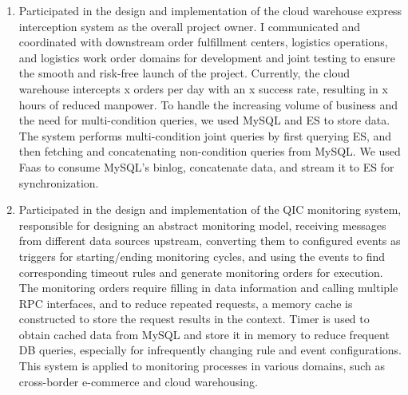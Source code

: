 \documentclass{resume}
\newcommand{\en}[1]{#1}
\newcommand{\zh}[1]{}
\begin{document}
\begin{itemize}
\begin{enumerate}
                      \zh{独自负责了「公有云测试流程」的开发，完善了ksboot新项目从零到一的搭建，包括不限于符合现代软件工程的设计规范、统一异常处理及RESTful风格返回。
                           此外，确保了新系统与nacos/星环的兼容性；并顺利实现了与旧云集平台的流程调用集成；定时任务切换为公司的任务调度平台；
                           权限采用前后端结合来控制，提高了系统安全性，并完善了测试流程对账相关的功能，基于用户反馈，我持续修复缺陷并升级系统功能，显著提升了测试流程的效率和系统的可维护性。
                           通过全面管理公有云测试资源，我实现了流程控制、逾期提醒及资源开通等功能，极大地简化了不同角色用户（如普通用户和SRE）对资源的操作和管理，提升了平台的使用便利性和效率。}
                \item \en{Participated in the design and implementation of the cloud warehouse express interception system as the overall project owner. I communicated and coordinated with downstream order fulfillment centers, logistics operations, and logistics work order domains for development and joint testing to ensure the smooth and risk-free launch of the project. Currently, the cloud warehouse intercepts x orders per day with an x success rate, resulting in x hours of reduced manpower. To handle the increasing volume of business and the need for multi-condition queries, we used MySQL and ES to store data. The system performs multi-condition joint queries by first querying ES, and then fetching and concatenating non-condition queries from MySQL. We used Faas to consume MySQL's binlog, concatenate data, and stream it to ES for synchronization.}
                      \zh{在华为云产品全流程接入CMP中担任核心开发者，负责设计与实施网络安全组、PaaS资源管理（特别是MongoDB）以及跨语言（Django、SpringBoot、Go）开发工作，显著提高了云资源的管理效率和系统安全性。}
                \item \en{Participated in the design and implementation of the QIC monitoring system, responsible for designing an abstract monitoring model, receiving messages from different data sources upstream, converting them to configured events as triggers for starting/ending monitoring cycles, and using the events to find corresponding timeout rules and generate monitoring orders for execution. The monitoring orders require filling in data information and calling multiple RPC interfaces, and to reduce repeated requests, a memory cache is constructed to store the request results in the context. Timer is used to obtain cached data from MySQL and store it in memory to reduce frequent DB queries, especially for infrequently changing rule and event configurations. This system is applied to monitoring processes in various domains, such as cross-border e-commerce and cloud warehousing.}

\end{enumerate}
\end{itemize}
\end{document}
